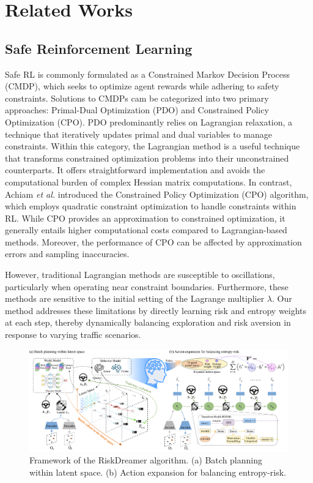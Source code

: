 \section{Related Works}
\label{sec:related_works}
\subsection{Safe Reinforcement Learning}
Safe RL is commonly formulated as a Constrained Markov Decision Process (CMDP)\cite{CMDP}, which seeks to optimize agent rewards while adhering to safety constraints. Solutions to CMDPs cam be categorized into two primary approaches: Primal-Dual Optimization (PDO)\cite{Primal_Dual_Optimization} and Constrained Policy Optimization (CPO). PDO predominantly relies on Lagrangian relaxation, a technique that iteratively updates primal and dual variables to manage constraints. Within this category, the Lagrangian method\cite{lagrangian} is a useful technique that transforms constrained optimization problems into their unconstrained counterparts. It offers straightforward implementation and avoids the computational burden of complex Hessian matrix computations. In contrast, Achiam \textit{et al.} introduced the Constrained Policy Optimization (CPO) algorithm\cite{CPO}, which employs quadratic constraint optimization to handle constraints within RL. While CPO provides an approximation to constrained optimization, it generally entails higher computational costs compared to Lagrangian-based methods. Moreover, the performance of CPO can be affected by approximation errors and sampling inaccuracies.

However, traditional Lagrangian methods are susceptible to oscillations, particularly when operating near constraint boundaries\cite{stooke2020responsive}. Furthermore, these methods are sensitive to the initial setting of the Lagrange multiplier $\lambda$. Our method addresses these limitations by directly learning risk and entropy weights at each step, thereby dynamically balancing exploration and risk aversion in response to varying traffic scenarios.


\begin{figure}[htbp]
    \centering
    \includegraphics[width=\textwidth]{fig/Algo.png}
    \caption{Framework of the RiskDreamer algorithm. (a) Batch planning within latent space. (b) Action expansion for balancing entropy-risk. }
    \label{fig:algo}
\end{figure}


